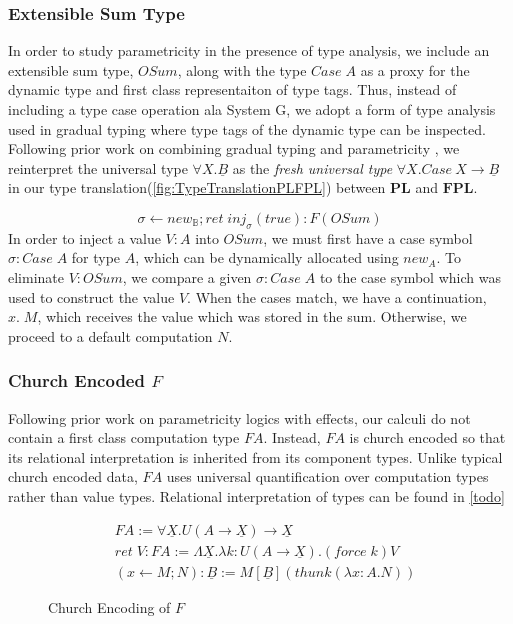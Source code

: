 \documentclass[acmsmall]{acmart}
\newcommand{\pl}{$\mathbf{PL}$}
\newcommand{\fpl}{$\mathbf{FPL}$}
\begin{document}
\subsubsection{Extensible Sum Type}\label{sec:OSum}
In order to study parametricity in the presence of type analysis, we include an extensible sum type, $OSum$, along with the type $Case\;A$ as a proxy for the dynamic type and first class representaiton of type tags. Thus, instead of including a type case operation ala System G\cite{NonParam}, we adopt a form of type analysis used in gradual typing where type tags of the dynamic type can be inspected. Following prior work on combining gradual typing and parametricity \cite{GradParam}, we reinterpret the universal type $\forall X. \underline{B}$ as the \textit{fresh universal type} $\forall X. Case\:X \rightarrow \underline{B}$ in our type translation(\cref{fig:TypeTranslationPLFPL}) between \pl\; and \fpl.


$$
\sigma \leftarrow new_{\mathbb{B}}; ret\; inj_\sigma (true) : F(OSum)
$$
In order to inject a value $V : A$ into $OSum$, we must first have a case symbol $\sigma : Case\;A$ for type $A$, which can be dynamically allocated using $new_A$. 
To eliminate $V : OSum$, we compare a given $\sigma : Case\;A$ to the case symbol which was used to construct the value $V$. When the cases match, we have a continuation, $x.\;M$, which receives the value which was stored in the sum. Otherwise, we proceed to a default computation $N$. 


\subsubsection{Church Encoded $F$}\label{sec:ChurchEncF}
Following prior work on parametricity logics with effects\cite{PE}, our calculi do not contain a first class computation type $FA$. Instead, $FA$ is church encoded so that its relational interpretation is inherited from its component types. Unlike typical church encoded data, $FA$ uses universal quantification over computation types rather than value types. Relational interpretation of types can be found in \cref{todo}
\begin{figure}[H]
  \centering
  \scriptsize
  \begin{align*}
    &FA := \forall \underline{X}.U(A \to \underline{X}) \to \underline{X}\\
    &ret\;V : F A := \Lambda \underline{X}.\lambda k:U(A \to \underline{X}). (force\; k)V\\
    &(x \leftarrow M; N) : \underline{B}:= M[\underline{B}](thunk(\lambda x : A.N))
  \end{align*}
  \caption{Church Encoding of $F$}
\end{figure}
\end{document}
